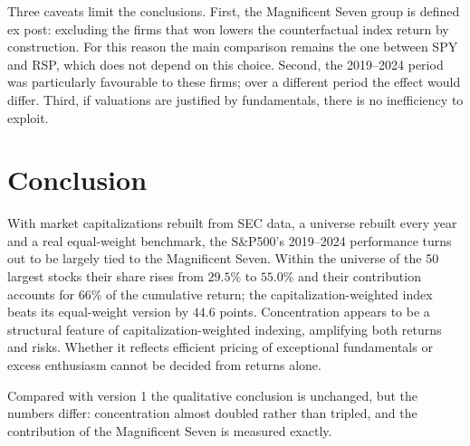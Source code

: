 \documentclass[12pt, a4paper]{article}
\begin{document}
Three caveats limit the conclusions. First, the Magnificent Seven group is defined ex post: excluding the firms that won lowers the counterfactual index return by construction. For this reason the main comparison remains the one between SPY and RSP, which does not depend on this choice. Second, the 2019--2024 period was particularly favourable to these firms; over a different period the effect would differ. Third, if valuations are justified by fundamentals, there is no inefficiency to exploit.

\section{Conclusion}

With market capitalizations rebuilt from SEC data, a universe rebuilt every year and a real equal-weight benchmark, the S\&P500's 2019--2024 performance turns out to be largely tied to the Magnificent Seven. Within the universe of the 50 largest stocks their share rises from $29.5\%$ to $55.0\%$ and their contribution accounts for $66\%$ of the cumulative return; the capitalization-weighted index beats its equal-weight version by $44.6$ points. Concentration appears to be a structural feature of capitalization-weighted indexing, amplifying both returns and risks. Whether it reflects efficient pricing of exceptional fundamentals or excess enthusiasm cannot be decided from returns alone.

Compared with version 1 the qualitative conclusion is unchanged, but the numbers differ: concentration almost doubled rather than tripled, and the contribution of the Magnificent Seven is measured exactly.



\end{document}
